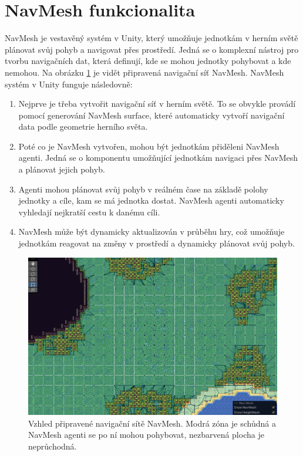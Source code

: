 \section{NavMesh funkcionalita}
\label{NavMesh}
NavMesh je vestavěný systém v Unity, který umožňuje jednotkám v herním světě plánovat svůj pohyb a navigovat přes prostředí. Jedná se o komplexní nástroj pro tvorbu navigačních dat, která definují, kde se mohou jednotky pohybovat a kde nemohou. Na obrázku \ref{fig:NavMesh} je vidět připravená navigační síť NavMesh. NavMesh systém v Unity funguje následovně:

\begin{enumerate}
	\item Nejprve je třeba vytvořit navigační síť v herním světě. To se obvykle provádí pomocí generování NavMesh surface, které automaticky vytvoří navigační data podle geometrie herního světa.
	\item Poté co je NavMesh vytvořen, mohou být jednotkám přiděleni NavMesh agenti. Jedná se o komponentu umožňující jednotkám navigaci přes NavMesh a plánovat jejich pohyb.
	\item Agenti mohou plánovat svůj pohyb v reálném čase na základě polohy jednotky a cíle, kam se má jednotka dostat. NavMesh agenti automaticky vyhledají nejkratší cestu k danému cíli.
	\item NavMesh může být dynamicky aktualizován v průběhu hry, což umožňuje jednotkám reagovat na změny v prostředí a dynamicky plánovat svůj pohyb.
\end{enumerate}

\begin{figure}[H]
	\centering
	\includegraphics[scale=0.6]{obrazky-figures/NavMeshBaked.png}
	\caption{Vzhled připravené navigační sítě NavMesh. Modrá zóna je schůdná a NavMesh agenti se po ní mohou pohybovat, nezbarvená plocha je neprůchodná.}
	\label{fig:NavMesh}
\end{figure}

